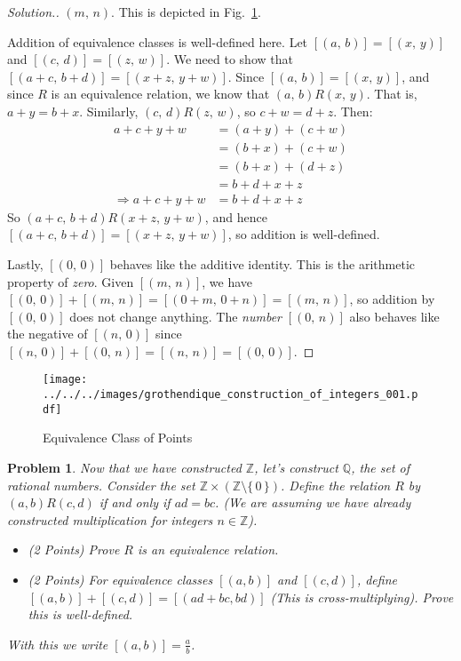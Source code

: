 \documentclass{article}
\theoremstyle{normal}
\newtheorem{problem}{Problem}
\begin{document}
\begin{proof}[Solution.]
        $(m,\,n)$. This is depicted in
        Fig.~\ref{fig:grothendique_construction_of_integers_001}.
        \par\hfill\par
        Addition of equivalence classes is well-defined here. Let
        $[(a,\,b)]=[(x,\,y)]$ and $[(c,\,d)]=[(z,\,w)]$. We need to show
        that $[(a+c,\,b+d)]=[(x+z,\,y+w)]$. Since $[(a,\,b)]=[(x,\,y)]$, and
        since $R$ is an equivalence relation, we know that
        $(a,\,b)R(x,\,y)$. That is, $a+y=b+x$. Similarly, $(c,\,d)R(z,\,w)$, so
        $c+w=d+z$. Then:
        \begin{align}
            a+c+y+w
            &=(a+y)+(c+w)\tag{Associativity and Commutativity}\\
            &=(b+x)+(c+w)\tag{Substitution}\\
            &=(b+x)+(d+z)\tag{Substitution}\\
            &=b+d+x+z\tag{Associativity and Commutativity}\\
            \Rightarrow
            a+c+y+w
            &=b+d+x+z\tag{Transitivity of Equality}
        \end{align}
        So $(a+c,\,b+d)R(x+z,\,y+w)$, and hence
        $[(a+c,\,b+d)]=[(x+z,\,y+w)]$, so addition is well-defined.
        \par\hfill\par
        Lastly, $[(0,\,0)]$ behaves like the additive identity. This is the
        arithmetic property of \textit{zero}. Given $[(m,\,n)]$, we have
        $[(0,\,0)]+[(m,\,n)]=[(0+m,\,0+n)]=[(m,\,n)]$, so addition by
        $[(0,\,0)]$ does not change anything. The \textit{number}
        $[(0,\,n)]$ also behaves like the negative of $[(n,\,0)]$ since
        $[(n,\,0)]+[(0,\,n)]=[(n,\,n)]=[(0,\,0)]$.
    \end{proof}
    \begin{figure}
        \centering
        \texttt{[image: ../../../images/grothendique\_construction\_of\_integers\_001.pdf]}
        \caption{Equivalence Class of Points}
        \label{fig:grothendique_construction_of_integers_001}
    \end{figure}
    \clearpage
    \color{blue}
    \begin{problem}
        Now that we have constructed $\mathbb{Z}$, let's construct $\mathbb{Q}$,
        the set of rational numbers. Consider the set
        $\mathbb{Z}\times(\mathbb{Z}\setminus\{\,0\,\})$. Define the relation
        $R$ by $(a,b)R(c,d)$ if and only if $ad=bc$. (We are assuming we have
        already constructed multiplication for integers $n\in\mathbb{Z}$).
        \begin{itemize}
            \item (2 Points) Prove $R$ is an equivalence relation.
            \item (2 Points) For equivalence classes $[(a,b)]$ and $[(c,d)]$,
                define $[(a,b)]+[(c,d)]=[(ad+bc,bd)]$ (This is
                \textit{cross-multiplying}). Prove this is well-defined.
        \end{itemize}
        With this we write $[(a,b)]=\frac{a}{b}$.
    \end{problem}
\end{document}
